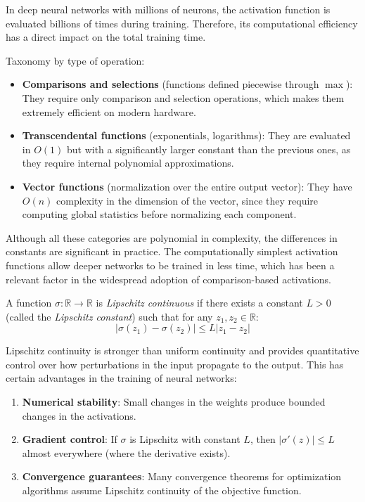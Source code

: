 In deep neural networks with millions of neurons, the activation function is evaluated billions of times during training. Therefore, its computational efficiency has a direct impact on the total training time.

Taxonomy by type of operation:
\begin{itemize}
	\item \textbf{Comparisons and selections} (functions defined piecewise through $\max$): They require only comparison and selection operations, which makes them extremely efficient on modern hardware.
	\item \textbf{Transcendental functions} (exponentials, logarithms): They are evaluated in $O(1)$ but with a significantly larger constant than the previous ones, as they require internal polynomial approximations.
	\item \textbf{Vector functions} (normalization over the entire output vector): They have $O(n)$ complexity in the dimension of the vector, since they require computing global statistics before normalizing each component.
\end{itemize}

Although all these categories are polynomial in complexity, the differences in constants are significant in practice. The computationally simplest activation functions allow deeper networks to be trained in less time, which has been a relevant factor in the widespread adoption of comparison-based activations.

\begin{definition}\label{prop:lipschitz_continuidad}
	A function $\sigma: \mathbb{R} \to \mathbb{R}$ is \textit{Lipschitz continuous} if there exists a constant $L > 0$ (called the \textit{Lipschitz constant}) such that for any $z_1, z_2 \in \mathbb{R}$:
	\[
	|\sigma(z_1) - \sigma(z_2)| \leq L |z_1 - z_2|
	\]
\end{definition}

Lipschitz continuity is stronger than uniform continuity and provides quantitative control over how perturbations in the input propagate to the output. This has certain advantages in the training of neural networks:

\begin{enumerate}
	\item \textbf{Numerical stability}: Small changes in the weights produce bounded changes in the activations.
	\item \textbf{Gradient control}: If $\sigma$ is Lipschitz with constant $L$, then $|\sigma'(z)| \leq L$ almost everywhere (where the derivative exists).
	\item \textbf{Convergence guarantees}: Many convergence theorems for optimization algorithms assume Lipschitz continuity of the objective function.
\end{enumerate}

